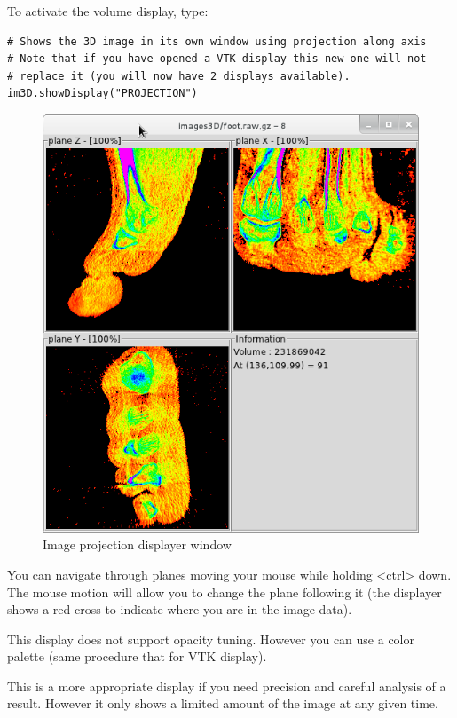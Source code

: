 \documentclass[a4paper,10pt,oneside]{article}
\begin{document}
To activate the volume display, type:

\lstset{language=Python}
\begin{lstlisting}
# Shows the 3D image in its own window using projection along axis
# Note that if you have opened a VTK display this new one will not
# replace it (you will now have 2 displays available).
im3D.showDisplay("PROJECTION")
\end{lstlisting}

\begin{figure}
\centering
\includegraphics[scale=0.5]{display_proj.png}
\caption{Image projection displayer window}
\label{fig:dis_base}
\end{figure}

You can navigate through planes moving your mouse while holding <ctrl> down.
The mouse motion will allow you to change the plane following it (the displayer
shows a red cross to indicate where you are in the image data).

This display does not support opacity tuning. However you can use a color
palette (same procedure that for VTK display).

This is a more appropriate display if you need precision and careful
analysis of a result. However it only shows a limited amount of the
image at any given time.
\end{document}
